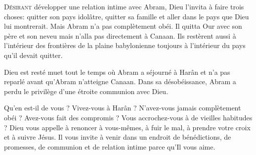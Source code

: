 





\lettrine{D}{ésirant} développer une relation intime avec Abram,
 Dieu l'invita à faire trois choses: quitter son pays idolâtre,
 quitter sa famille et aller dans le pays que Dieu lui montrerait.
 Mais Abram n'a pas complètement obéi.
 Il quitta Our avec son père et son neveu mais n'alla pas directement
 à Canaan.
 Ils restèrent aussi à l'intérieur des frontières de la plaine babylonienne
 \ocadr{}toujours à l'intérieur du pays qu'il devait quitter. 


Dieu est resté muet tout le temps où Abram a séjourné à Harân
 et n'a pas reparlé avant qu'Abram n'atteigne Canaan.
 Dans sa désobéissance, Abram a perdu le privilège d'une étroite
 communion avec Dieu. 

Qu'en est-il de vous ? Vivez-vous à Harân ?
 N'avez-vous jamais complètement obéi ? Avez-vous fait des compromis ?
 Vous accrochez-vous à de vieilles habitudes ?
 Dieu vous appelle à renoncer à vous-mêmes, à fuir le mal,
 à prendre votre croix et à suivre Jésus.
 Il vous invite à venir dans un endroit de bénédictions,
 de promesses, de communion et de relation intime
 \ocadr{} parce qu'Il vous aime. 

\dvrule




